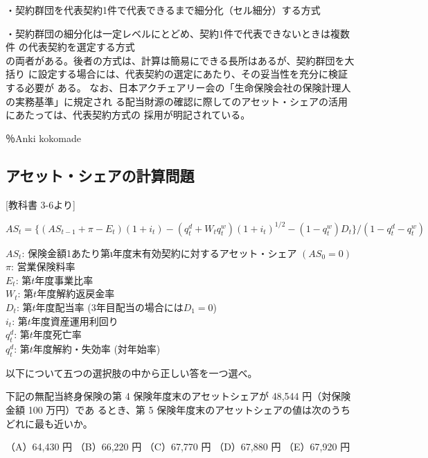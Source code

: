 \documentclass[report,gutter=10mm,fore-edge=10mm,uplatex,dvipdfmx]{jlreq}
\begin{document}
・契約群団を代表契約1件で代表できるまで細分化（セル細分）する方式

・契約群団の細分化は一定レベルにとどめ、契約1件で代表できないときは複数件
の代表契約を選定する方式\\
の両者がある。後者の方式は、計算は簡易にできる長所はあるが、契約群団を大括り
に設定する場合には、代表契約の選定にあたり、その妥当性を充分に検証する必要が
ある。
なお、日本アクチェアリー会の「生命保険会社の保険計理人の実務基準」に規定され
る配当財源の確認に際してのアセット・シェアの活用にあたっては、代表契約方式の
採用が明記されている。

％Anki kokomade

\subsection{アセット・シェアの計算問題}

[教科書 3-6より]

$
AS_t=\{(AS_{t-1}+\pi - E_t)(1+i_t) - (q_t^d+W_tq_t^w)(1+i_t)^{1/2}-(1-q_t^w)D_t\}/(1-q_t^d-q_t^w)
$

\noindent
$AS_t$: 保険金額1あたり第ι年度末有効契約に対するアセット・シェア $(AS_0=0)$\\
$\pi$: 営業保険料率\\
$E_t$: 第$t$年度事業比率\\
$W_t$: 第$t$年度解約返戻金率\\
$D_t$: 第$t$年度配当率 (3年目配当の場合には$D_1=0$)\\
$i_t$: 第$t$年度資産運用利回り\\
$q_t^d$: 第$t$年度死亡率\\
$q_t^d$: 第$t$年度解約・失効率 (対年始率)

以下について五つの選択肢の中から正しい答を一つ選べ。

下記の無配当終身保険の第 4 保険年度末のアセットシェアが 48,544 円（対保険金額 100 万円）であ
るとき、第 5 保険年度末のアセットシェアの値は次のうちどれに最も近いか。

（A）64,430 円
（B）66,220 円
（C）67,770 円
（D）67,880 円
（E）67,920 円
\end{document}
